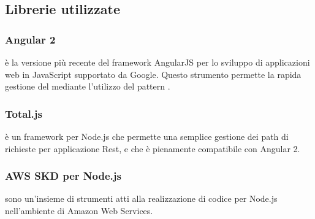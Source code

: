 \documentclass[../NormeDiProgetto.tex]{subfiles}
\begin{document}
      \subsection{Librerie utilizzate}

            \subsubsection{Angular 2}
             è la versione più recente del framework AngularJS per lo sviluppo di applicazioni web  in JavaScript supportato da Google. Questo strumento permette la rapida gestione del  mediante l'utilizzo del pattern .

            \subsubsection{Total.js}
             è un framework per Node.js che permette una semplice gestione dei path di richieste per applicazione Rest, e che è pienamente compatibile con Angular 2.

            \subsubsection{AWS SKD per Node.js}
             sono un'insieme di strumenti atti alla realizzazione di codice per Node.js nell'ambiente di Amazon Web Services.
\end{document}
